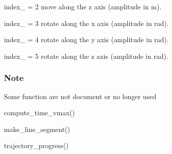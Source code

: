 {\ttfamily index\+\_\+} = 2 move along the z axis ({\ttfamily amplitude} in m).

{\ttfamily index\+\_\+} = 3 rotate along the x axis ({\ttfamily amplitude} in rad).

{\ttfamily index\+\_\+} = 4 rotate along the y axis ({\ttfamily amplitude} in rad).

{\ttfamily index\+\_\+} = 5 rotate along the z axis ({\ttfamily amplitude} in rad).

\subsubsection*{Note}

Some function are not document or no longer used

{\ttfamily compute\+\_\+time\+\_\+vmax()}

{\ttfamily make\+\_\+line\+\_\+segment()}

{\ttfamily trajectory\+\_\+progress()} 